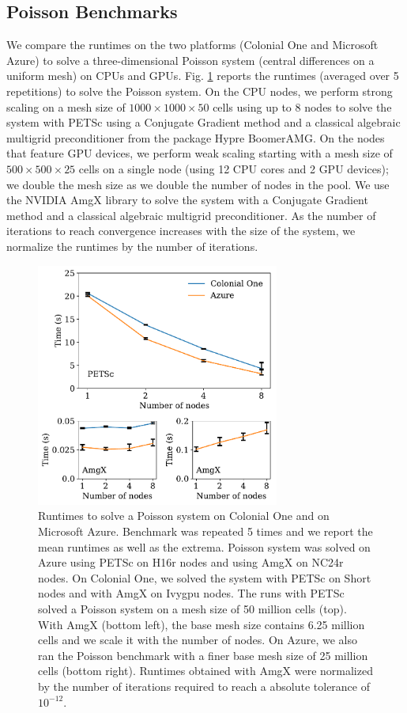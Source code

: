 \documentclass[10pt,journal,compsoc]{IEEEtran}
\begin{document}
\subsection{Poisson Benchmarks}\label{subsec:poisson_benchmarks}

We compare the runtimes on the two platforms (Colonial One and Microsoft Azure) to solve a three-dimensional Poisson system (central differences on a uniform mesh) on CPUs and GPUs.
Fig. \ref{fig:poisson_benchmarks} reports the runtimes (averaged over 5 repetitions) to solve the Poisson system.
On the CPU nodes, we perform strong scaling on a mesh size of $1000 \times 1000 \times 50$ cells using up to 8 nodes to solve the system with PETSc using a Conjugate Gradient method and a classical algebraic multigrid preconditioner from the package Hypre BoomerAMG.
On the nodes that feature GPU devices, we perform weak scaling starting with a mesh size of $500 \times 500 \times 25$ cells on a single node (using 12 CPU cores and 2 GPU devices); we double the mesh size as we double the number of nodes in the pool.
We use the NVIDIA AmgX library to solve the system with a Conjugate Gradient method and a classical algebraic multigrid preconditioner.
As the number of iterations to reach convergence increases with the size of the system, we normalize the runtimes by the number of iterations.

\begin{figure}[!h]
    \centering
    \includegraphics[width=8cm]{figures/poisson_time_vs_nodes.pdf}
    \caption{Runtimes to solve a Poisson system on Colonial One and on Microsoft Azure. Benchmark was repeated 5 times and we report the mean runtimes as well as the extrema. Poisson system was solved on Azure using PETSc on H16r nodes and using AmgX on NC24r nodes. On Colonial One, we solved the system with PETSc on Short nodes and with AmgX on Ivygpu nodes. The runs with PETSc solved a Poisson system on a mesh size of 50 million cells (top). With AmgX (bottom left), the base mesh size contains 6.25 million cells and we scale it with the number of nodes. On Azure, we also ran the Poisson benchmark with a finer base mesh size of 25 million cells (bottom right). Runtimes obtained with AmgX were normalized by the number of iterations required to reach a absolute tolerance of $10^{-12}$.}
    \label{fig:poisson_benchmarks}
\end{figure}
\end{document}
